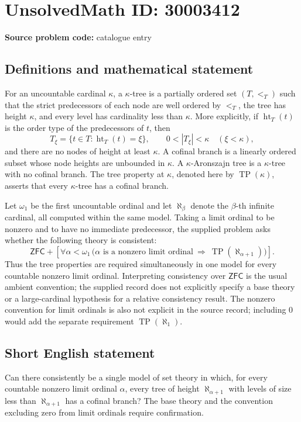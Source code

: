 \documentclass[11pt]{article}
\begin{document}
\section*{UnsolvedMath ID: 30003412}
\textbf{Source problem code:} catalogue entry
\subsection{Definitions and mathematical statement}
For an uncountable cardinal \(\kappa\), a \(\kappa\)-tree is a partially ordered set \((T,<_{T})\) such that the strict predecessors of each node are well ordered by \(<_{T}\), the tree has height \(\kappa\), and every level has cardinality less than \(\kappa\). More explicitly, if \(\operatorname{ht}_{T}(t)\) is the order type of the predecessors of \(t\), then
\[
T_\xi=\{t\in T:\operatorname{ht}_{T}(t)=\xi\},\qquad
0<|T_\xi|<\kappa\quad(\xi<\kappa),
\]
and there are no nodes of height at least \(\kappa\). A cofinal branch is a linearly ordered subset whose node heights are unbounded in \(\kappa\). A \(\kappa\)-Aronszajn tree is a \(\kappa\)-tree with no cofinal branch. The tree property at \(\kappa\), denoted here by \(\operatorname{TP}(\kappa)\), asserts that every \(\kappa\)-tree has a cofinal branch.

Let \(\omega_1\) be the first uncountable ordinal and let \(\aleph_\beta\) denote the \(\beta\)-th infinite cardinal, all computed within the same model. Taking a limit ordinal to be nonzero and to have no immediate predecessor, the supplied problem asks whether the following theory is consistent:
\[
\mathsf{ZFC}+\left[\forall\alpha<\omega_1\,
\bigl(\alpha\text{ is a nonzero limit ordinal}\ \Longrightarrow\
\operatorname{TP}(\aleph_{\alpha+1})\bigr)\right].
\]
Thus the tree properties are required simultaneously in one model for every countable nonzero limit ordinal. Interpreting consistency over \(\mathsf{ZFC}\) is the usual ambient convention; the supplied record does not explicitly specify a base theory or a large-cardinal hypothesis for a relative consistency result. The nonzero convention for limit ordinals is also not explicit in the source record; including \(0\) would add the separate requirement \(\operatorname{TP}(\aleph_1)\).
\subsection{Short English statement}
Can there consistently be a single model of set theory in which, for every countable nonzero limit ordinal \(\alpha\), every tree of height \(\aleph_{\alpha+1}\) with levels of size less than \(\aleph_{\alpha+1}\) has a cofinal branch? The base theory and the convention excluding zero from limit ordinals require confirmation.
\end{document}
